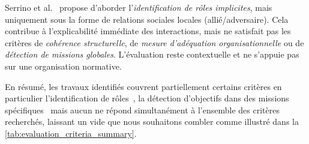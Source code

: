 \documentclass[francais,ROIA,Unicode,manuscript]{cedram}
\begin{document}
Serrino et al.~\cite{serrino2019finding} propose d'aborder l’\emph{identification de rôles implicites}, mais uniquement sous la forme de relations sociales locales (allié/adversaire). Cela contribue à l’explicabilité immédiate des interactions, mais ne satisfait pas les critères de \emph{cohérence structurelle}, de \emph{mesure d’adéquation organisationnelle} ou de \emph{détection de missions globales}. L’évaluation reste contextuelle et ne s’appuie pas sur une organisation normative.

\medskip
\noindent
En résumé, les travaux identifiés couvrent partiellement certains critères en particulier l’identification de rôles~\cite{serrino2019finding,wilson2008learning}, la détection d’objectifs dans des missions spécifiques~\cite{berenji2000learning} mais aucun ne répond simultanément à l’ensemble des critères recherchés, laissant un vide que nous souhaitons combler comme illustré dans la \autoref{tab:evaluation_criteria_summary}.
\end{document}
